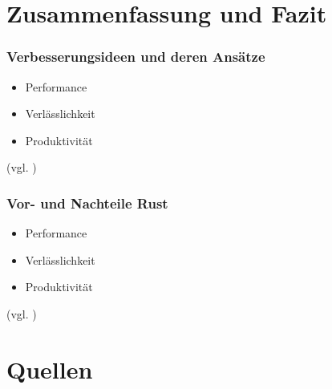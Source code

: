 \documentclass{beamer}
\begin{document}
\section{Zusammenfassung und Fazit}
\begin{frame}[fragile]
  \frametitle{Verbesserungsideen und deren Ansätze}
  \begin{itemize}
    \item Performance
    \pause
    \item Verlässlichkeit
    \pause
    \item Produktivität
  \end{itemize}
  {\small (vgl. \cite{WhyRust})}
\end{frame}

\begin{frame}[fragile]
  \frametitle{Vor- und Nachteile Rust}
  \begin{itemize}
    \item Performance
    \pause
    \item Verlässlichkeit
    \pause
    \item Produktivität
  \end{itemize}
  {\small (vgl. \cite{WhyRust})}
\end{frame}

\section{Quellen}
\begin{frame}
  
  \raggedright
  
\end{frame}
\end{document}
